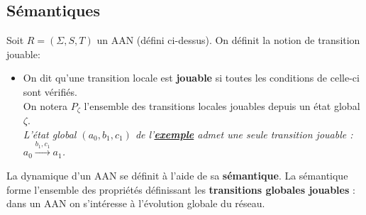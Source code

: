 \documentclass[12pt,a4paper]{article}
\begin{document}
\subsection{Sémantiques}
Soit $R = (\Sigma,S,T)$ un AAN (défini ci-dessus). On définit la notion de transition jouable:
\begin{itemize}
	\item On dit qu'une transition locale est \textbf{jouable} si toutes les conditions de celle-ci sont vérifiés.\\
	On notera $P_{\zeta}$ l'ensemble des transitions locales jouables depuis un état global $\zeta$.\\
	\emph{L'état global $(a_0,b_1,c_1)$ de l'\hyperlink{exemple}{\textbf{exemple}} admet une seule transition jouable : $a_0\xrightarrow{b_1,c_1} a_1$.}
\end{itemize}
La dynamique d'un AAN se définit à l'aide de sa \textbf{sémantique}. La sémantique forme l'ensemble des propriétés définissant les \textbf{transitions globales jouables} : dans un AAN on s'intéresse à l'évolution globale du réseau.
\end{document}
